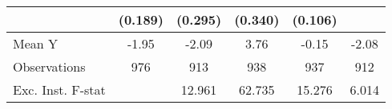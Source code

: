 {\begin{tabular}{l*{5}{c}}
            &     (0.189)         &     (0.295)         &     (0.340)         &     (0.106)         &                     \\
\midrule
Mean Y      &       -1.95         &       -2.09         &        3.76         &       -0.15         &       -2.08         \\
Observations&         976         &         913         &         938         &         937         &         912         \\
Exc. Inst. F-stat&                     &      12.961         &      62.735         &      15.276         &       6.014         \\
\bottomrule
\end{tabular}
}

